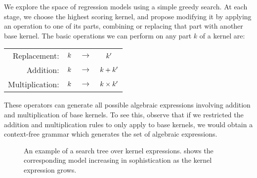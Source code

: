 We explore the space of regression models using a simple greedy search.
At each stage, we choose the highest scoring kernel, and propose modifying it by applying an operation to one of its parts, combining or replacing that part with another base kernel.
The basic operations we can perform on any part $k$ of a kernel are:
%
\begin{center}
\begin{tabular}{rccc}
\textnormal{Replacement:}    & $k$ & $\to$ & $k'$\\
\textnormal{Addition:}       & $k$ & $\to$ & $k + k'$\\
\textnormal{Multiplication:} & $k$ &  $\to$ & $k \times k'$\\
\end{tabular}
\end{center}
%
These operators can generate all possible algebraic expressions involving addition and multiplication of base kernels.
To see this, observe that if we restricted the addition and multiplication rules to only apply to base kernels, we would obtain a context-free grammar which generates the set of algebraic expressions.

\begin{figure}
\centering
\newcommand{\treescale}{*1.5\columnwidth}
\caption[A search tree over kernels]{An example of a search tree over kernel expressions.
 shows the corresponding model increasing in sophistication as the kernel expression grows.
}
\label{fig:mauna_search_tree}
\end{figure}

